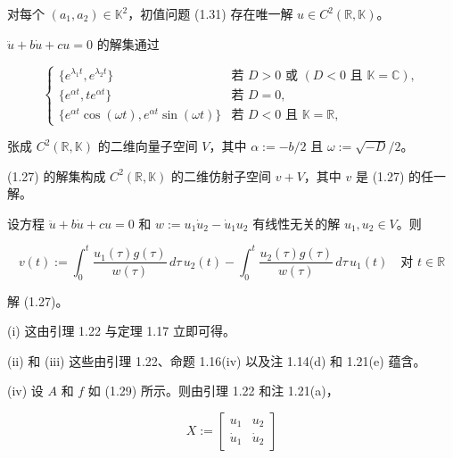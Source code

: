 \begin{theorem}

\begin{subitems}
\item

对每个 $ (a_{1},a_{2}) \in \mathbb{K}^{2} $，初值问题 (1.31) 存在唯一解 $ u \in C^{2}(\mathbb{R}, \mathbb{K}) $。

\item

$ \ddot{u} + b\dot{u} + cu = 0 $ 的解集通过

\begin{equation*}
\begin{cases} \{e^{\lambda_{1}t}, e^{\lambda_{2}t}\} & \text{若 } D > 0 \text{ 或 } (D < 0 \text{ 且 } \mathbb{K} = \mathbb{C}) , \\ \{e^{\alpha t}, te^{\alpha t}\} & \text{若 } D = 0 , \\ \{e^{\alpha t}\cos(\omega t), e^{\alpha t}\sin(\omega t)\} & \text{若 } D < 0 \text{ 且 } \mathbb{K} = \mathbb{R} , \end{cases}
\end{equation*}

张成 $ C^{2}(\mathbb{R}, \mathbb{K}) $ 的二维向量子空间 $ V $，其中 $ \alpha := -b/2 $ 且 $ \omega := \sqrt{-D}/2 $。

\item

(1.27) 的解集构成 $ C^{2}(\mathbb{R}, \mathbb{K}) $ 的二维仿射子空间 $ v + V $，其中 $ v $ 是 (1.27) 的任一解。

\item

设方程 $ \ddot{u} + b\dot{u} + cu = 0 $ 和 $ w := u_{1}\dot{u}_{2} - \dot{u}_{1}u_{2} $ 有线性无关的解 $ u_{1}, u_{2} \in V $。则

\[
v(t) := \int_{0}^{t}\frac{u_{1}(\tau)g(\tau)}{w(\tau)}\,d\tau\,u_{2}(t) - \int_{0}^{t}\frac{u_{2}(\tau)g(\tau)}{w(\tau)}\,d\tau\,u_{1}(t) \quad \text{对 } t \in \mathbb{R}
\]

解 (1.27)。

\proofhead
(i) 这由引理 1.22 与定理 1.17 立即可得。
\end{subitems}

(ii) 和 (iii) 这些由引理 1.22、命题 1.16(iv) 以及注 1.14(d) 和 1.21(e) 蕴含。

(iv) 设 $ A $ 和 $ f $ 如 (1.29) 所示。则由引理 1.22 和注 1.21(a)，

\begin{equation*}
X := \begin{bmatrix} u_{1} & u_{2} \\ \dot{u}_{1} & \dot{u}_{2} \end{bmatrix}
\end{equation*}


\end{theorem}
